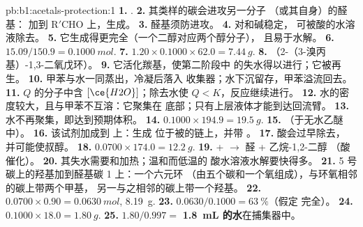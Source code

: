 \begin{solution}{pb:b1:acetals-protection:1}
\textbf{1.} .
\textbf{2.} 其类样的碳会进攻另一分子
（或其自身）的醛基： 加到 $\mathrm{R'CHO}$ 上，生成。
\textbf{3.} 醛基须防进攻。
\textbf{4.} 对和碱稳定，
可被酸的水溶液除去。
\textbf{5.} 它生成得更完全（一个二醇对应两个醇分子），
且易于水解。
\textbf{6.} $15.09/150.9 = \qty{0.1000}{mol}$.
\textbf{7.} $1.20 \times 0.1000 \times 62.0 = \qty{7.44}{g}$.
\textbf{8.} 
（2-（3-溴丙基）-1,3-二氧戊环）。
\textbf{9.} 它活化羰基，使第二阶段中
的失水得以进行；它被再生。
\textbf{10.} 甲苯与水一同蒸出，冷凝后落入
收集器；水下沉留存，甲苯溢流回去。
\textbf{11.} $Q$ 的分子中含 $[\ce{H2O}]$；除去水使
$Q < K$，反应继续进行。
\textbf{12.} 水的密度较大，且与甲苯不互溶：它聚集在
底部；只有上层液体才能到达回流臂。
\textbf{13.} 水不再聚集，即达到预期体积。
\textbf{14.} $0.1000 \times 194.9 = \qty{19.5}{g}$.
\textbf{15.} （于无水乙醚中）。
\textbf{16.} 该试剂加成到  上：生成
 位于被的链上，并带 。
\textbf{17.} 酸会过早除去，
并可能使叔醇。
\textbf{18.} $0.0700 \times 174.0 = \qty{12.2}{g}$.
\textbf{19.}  +  $\to$ 醛 + 乙烷-1,2-二醇
（酸催化）。
\textbf{20.} 其失水需要和加热；温和而低温的
酸水溶液水解要快得多。
\textbf{21.} 5 号碳上的羟基加到醛基碳 1 上：一个六元环
（由五个碳和一个氧组成），与环氧相邻的碳上带两个甲基，
另一与之相邻的碳上带一个羟基。
\textbf{22.} $0.0700 \times 0.90 = \qty{0.0630}{mol}$, \qty{8.19}{g}.
\textbf{23.} $0.0630/0.1000 = \qty{63}{\percent}$（假定
完全）。
\textbf{24.} $0.1000 \times 18.0 = \qty{1.80}{g}$.
\textbf{25.} $1.80/0.997 =$ \textbf{\qty{1.8}{mL} 的水}在捕集器中。
\end{solution}

